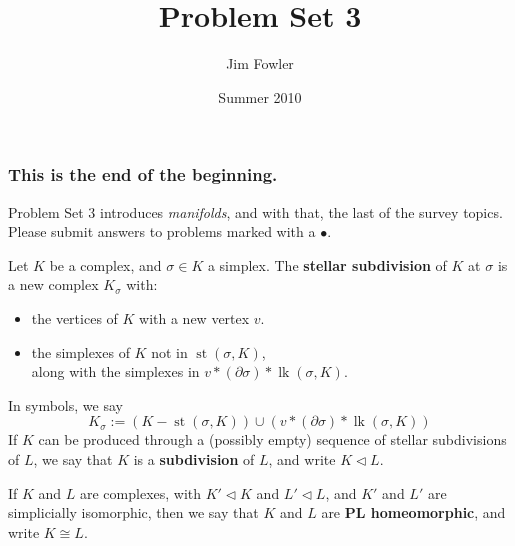 \documentclass[12pt]{pset}
\title{Problem Set 3}
\author{Jim Fowler}
\date{Summer 2010}
\newcommand{\boundary}{\partial}
\newcommand{\join}{\ast}
\newcommand{\subdivided}{\triangleleft}
\DeclareMathOperator{\st}{st}
\DeclareMathOperator{\lk}{lk}
\begin{document}
\maketitle

\subsubsection*{This is the end of the beginning.} Problem Set 3 introduces
\textit{manifolds}, and with that, the last of the survey
topics.  Please submit answers to problems marked with a $\bullet$.




\begin{definition*}
    Let $K$ be a complex, and $\sigma \in K$ a simplex. 
    The \textbf{stellar subdivision} of $K$ at $\sigma$ is a new complex
    $K_\sigma$ with:
    \begin{itemize}
    \item the vertices of $K$ with a new vertex $v$.
    \item the simplexes of $K$ not in $\st(\sigma,K)$,\\
      along with the simplexes in $v \join (\boundary \sigma) \join \lk(\sigma,K)$.
    \end{itemize}
    In symbols, we say
    $$
    K_\sigma := (K - \st(\sigma,K)) \cup (v \join (\boundary \sigma) \join
    \lk(\sigma,K))
    $$
    If $K$ can be produced through a (possibly
    empty) sequence of stellar subdivisions of $L$, 
    we say that $K$ is a   \textbf{subdivision} of $L$, 
    and write $K \subdivided L$.

    If $K$ and $L$ are complexes, with $K' \subdivided K$ and $L'
    \subdivided L$, and $K'$ and $L'$ are simplicially isomorphic,
    then we say that $K$ and $L$ are \textbf{PL homeomorphic}, and
    write $K \cong L$.
\end{definition*}
\end{document}
